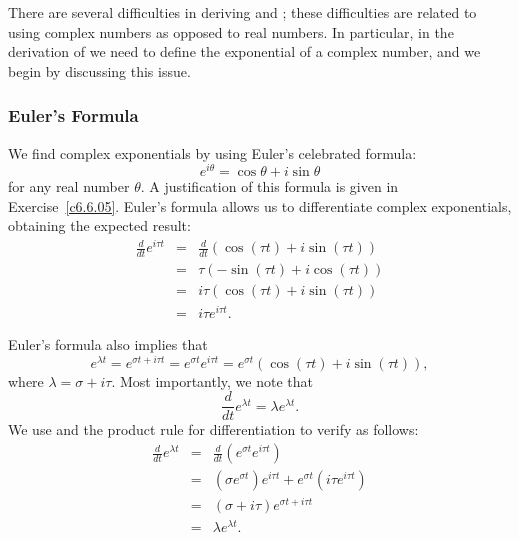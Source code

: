 \documentclass{ximera}
\begin{document}
There are several difficulties in deriving  and ; these
difficulties are related to using complex numbers as opposed to real numbers.
In particular, in the derivation of  we need to define the
exponential of a complex number, and we begin by discussing this issue.

\subsubsection*{Euler's Formula}

We find complex exponentials by using Euler's celebrated formula:
\begin{equation}  \label{E:Euler}
e^{i\theta} = \cos\theta + i\sin\theta
\end{equation}
for any real number $\theta$.  A justification of this formula is
given in Exercise~\ref{c6.6.05}.   Euler's formula allows us to differentiate
complex exponentials, obtaining the expected result:
\begin{eqnarray*}
\frac{d}{dt}e^{i\tau t} & = &
\frac{d}{dt}(\cos(\tau t) + i\sin(\tau t))\\
& = & \tau(-\sin(\tau t) + i\cos(\tau t)) \\
& = & i\tau(\cos(\tau t) + i\sin(\tau t))\\
& = & i\tau e^{i\tau t}.
\end{eqnarray*}

Euler's formula also implies that
\begin{equation}  \label{E:ecis}
e^{\lambda t} = e^{\sigma t + i\tau t} = e^{\sigma t}e^{i\tau t} =
e^{\sigma t}(\cos(\tau t) + i\sin(\tau t)),
\end{equation}
where $\lambda = \sigma+i\tau$.  Most importantly, we note that
\begin{equation}  \label{E:eldiff}
\frac{d}{dt}e^{\lambda t} = \lambda e^{\lambda t}.
\end{equation}
We use  and the product rule for differentiation to verify
 as follows:
\begin{eqnarray*}
\frac{d}{dt}e^{\lambda t} & =  &
\frac{d}{dt}\left(e^{\sigma t}e^{i\tau t}\right)\\
& = & \left(\sigma e^{\sigma t}\right)e^{i\tau t}
+ e^{\sigma t}\left(i\tau e^{i\tau t}\right)\\
& = & (\sigma+i\tau)e^{\sigma t + i\tau t} \\
& = & \lambda e^{\lambda t}.
\end{eqnarray*}
\end{document}
